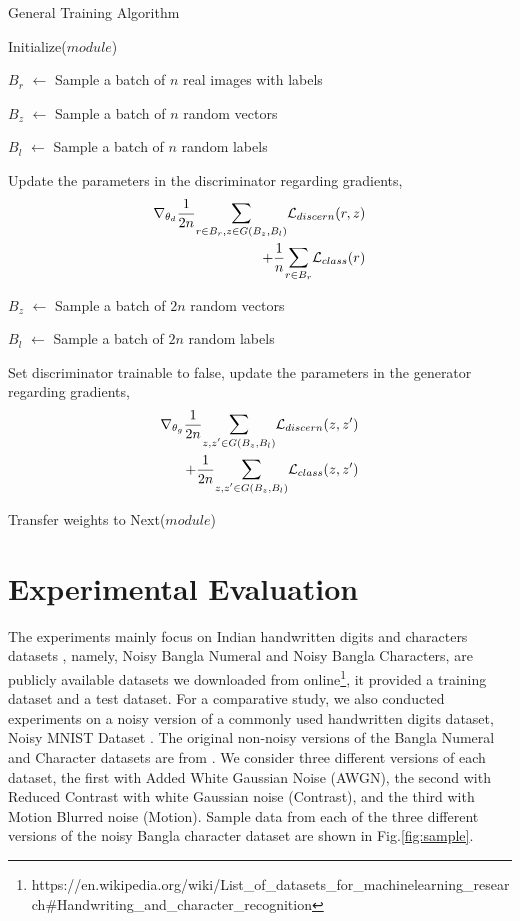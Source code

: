 \documentclass[runningheads]{llncs}
\begin{document}
\begin{algorithm}[t]
\caption{General Training Algorithm} \label{alg1}
{
    Initialize($module$) \par
    {
        {
            $B_r$ $\gets$ Sample a batch of $n$ real images with labels \par
            $B_z$ $\gets$ Sample a batch of $n$ random vectors \par
            $B_l$ $\gets$ Sample a batch of $n$ random labels \par
            Update the parameters in the discriminator regarding gradients,
            \begin{align*}
            \nabla_{\theta_d} \dfrac{1}{2n} \mathlarger{\sum}_{r \in B_r, z \in G(B_z, B_l)} \mathcal{L}_{discern}(r, z) \\
            + \dfrac{1}{n} \mathlarger{\sum}_{r \in B_r} \mathcal{L}_{class}(r)
            \end{align*}
            
            $B_z$ $\gets$ Sample a batch of $2n$ random vectors \par
            $B_l$ $\gets$ Sample a batch of $2n$ random labels \par
            Set discriminator trainable to false, update the parameters in the generator regarding gradients,
            \begin{align*} 
            \nabla_{\theta_g} \dfrac{1}{2n} \mathlarger{\sum}_{z, z' \in G(B_z, B_l)} \mathcal{L}_{discern}(z, z') \\
            + \dfrac{1}{2n} \mathlarger{\sum}_{z, z' \in G(B_z, B_l)} \mathcal{L}_{class}(z, z')
            \end{align*} 
            }
    }
    Transfer weights to Next($module$)
}
\end{algorithm}

\section{Experimental Evaluation}\label{exp}
The experiments mainly focus on Indian handwritten digits and characters datasets \cite{Karki18}, namely, Noisy Bangla Numeral and Noisy Bangla Characters, are publicly available datasets we downloaded from online\footnote{https://en.wikipedia.org/wiki/List\_of\_datasets\_for\_machine\-learning\_research\#Handwriting\_and\_character\_recognition}, it provided a training dataset and a test dataset. For a comparative study, we also conducted experiments on a noisy version of a commonly used handwritten digits dataset, Noisy MNIST Dataset \cite{Karki18}. The original non-noisy versions of the Bangla Numeral and Character datasets are from \cite{bhattacharya2009handwritten, bhattacharya2012offline}.  We consider three different versions of each dataset, the first with Added White Gaussian Noise (AWGN),  the second with Reduced Contrast with white Gaussian noise (Contrast), and  the third with Motion Blurred noise (Motion). Sample data from each of the three different versions of the noisy Bangla character dataset are shown in  Fig.\ref{fig:sample}. 
\end{document}
